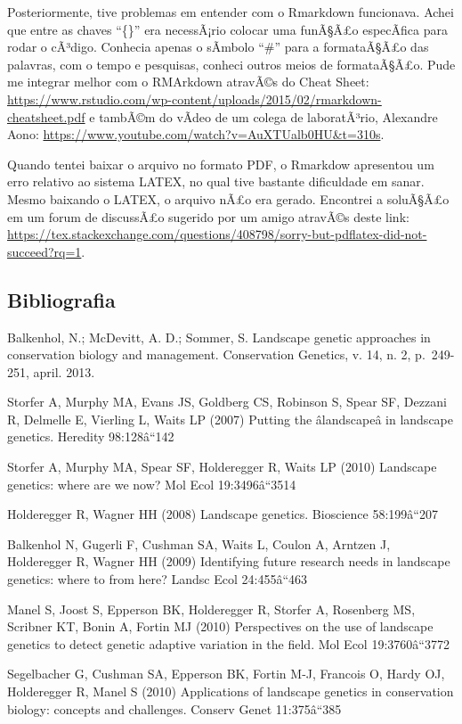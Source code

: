 \documentclass[]{article}
\begin{document}
Posteriormente, tive problemas em entender com o Rmarkdown funcionava.
Achei que entre as chaves ``\{\}'' era necessÃ¡rio colocar uma funÃ§Ã£o
especÃ­fica para rodar o cÃ³digo. Conhecia apenas o sÃ­mbolo ``\#'' para
a formataÃ§Ã£o das palavras, com o tempo e pesquisas, conheci outros
meios de formataÃ§Ã£o. Pude me integrar melhor com o RMArkdown atravÃ©s
do Cheat Sheet:
\url{https://www.rstudio.com/wp-content/uploads/2015/02/rmarkdown-cheatsheet.pdf}
e tambÃ©m do vÃ­deo de um colega de laboratÃ³rio, Alexandre Aono:
\url{https://www.youtube.com/watch?v=AuXTUalb0HU\&t=310s}.

Quando tentei baixar o arquivo no formato PDF, o Rmarkdow apresentou um
erro relativo ao sistema LATEX, no qual tive bastante dificuldade em
sanar. Mesmo baixando o LATEX, o arquivo nÃ£o era gerado. Encontrei a
soluÃ§Ã£o em um forum de discussÃ£o sugerido por um amigo atravÃ©s deste
link:
\url{https://tex.stackexchange.com/questions/408798/sorry-but-pdflatex-did-not-succeed?rq=1}.

\subsection{\texorpdfstring{\textbf{Bibliografia}}{Bibliografia}}\label{bibliografia}

Balkenhol, N.; McDevitt, A. D.; Sommer, S. Landscape genetic approaches
in conservation biology and management. Conservation Genetics, v. 14, n.
2, p.~249-251, april. 2013.

Storfer A, Murphy MA, Evans JS, Goldberg CS, Robinson S, Spear SF,
Dezzani R, Delmelle E, Vierling L, Waits LP (2007) Putting the
âlandscapeâ in landscape genetics. Heredity 98:128â``142

Storfer A, Murphy MA, Spear SF, Holderegger R, Waits LP (2010) Landscape
genetics: where are we now? Mol Ecol 19:3496â``3514

Holderegger R, Wagner HH (2008) Landscape genetics. Bioscience
58:199â``207

Balkenhol N, Gugerli F, Cushman SA, Waits L, Coulon A, Arntzen J,
Holderegger R, Wagner HH (2009) Identifying future research needs in
landscape genetics: where to from here? Landsc Ecol 24:455â``463

Manel S, Joost S, Epperson BK, Holderegger R, Storfer A, Rosenberg MS,
Scribner KT, Bonin A, Fortin MJ (2010) Perspectives on the use of
landscape genetics to detect genetic adaptive variation in the field.
Mol Ecol 19:3760â``3772

Segelbacher G, Cushman SA, Epperson BK, Fortin M-J, Francois O, Hardy
OJ, Holderegger R, Manel S (2010) Applications of landscape genetics in
conservation biology: concepts and challenges. Conserv Genet
11:375â``385
\end{document}
